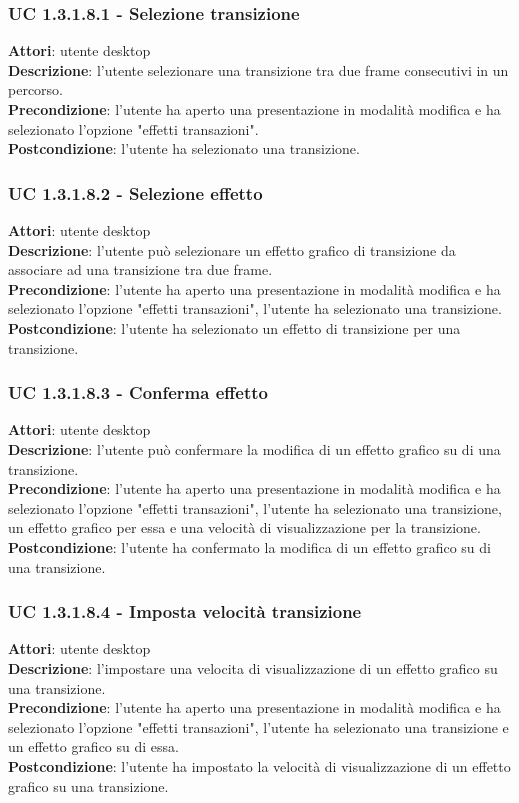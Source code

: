 \subsubsection{UC 1.3.1.8.1 - Selezione transizione}{
	\label{uc1.3.1..8.1}
	\textbf{Attori}: utente desktop \\
	\textbf{Descrizione}: l'utente selezionare una transizione tra due frame consecutivi in un percorso. \\
	\textbf{Precondizione}: l'utente ha aperto una presentazione in modalità modifica e ha selezionato l'opzione "effetti transazioni".	\\
	\textbf{Postcondizione}: l'utente ha selezionato una transizione.	
}
\subsubsection{UC 1.3.1.8.2 - Selezione effetto}{
	\label{uc1.3.1.8.2}
	\textbf{Attori}: utente desktop \\
	\textbf{Descrizione}: l'utente può selezionare un effetto grafico di transizione da associare ad una transizione tra due frame. \\
	\textbf{Precondizione}: l'utente ha aperto una presentazione in modalità modifica e ha selezionato l'opzione "effetti transazioni", l'utente ha selezionato una transizione.	\\
	\textbf{Postcondizione}: l'utente ha selezionato un effetto di transizione per una transizione.	
}
\subsubsection{UC 1.3.1.8.3 - Conferma effetto}{
	\label{uc1.3.1.8.3}
	\textbf{Attori}: utente desktop \\
	\textbf{Descrizione}: l'utente può confermare la modifica di un effetto grafico su di una transizione. \\
	\textbf{Precondizione}: l'utente ha aperto una presentazione in modalità modifica e ha selezionato l'opzione "effetti transazioni", l'utente ha selezionato una transizione, un effetto grafico per essa e una velocità di visualizzazione per la transizione.	\\
	\textbf{Postcondizione}: l'utente ha confermato la modifica di un effetto grafico su di una transizione.
}
\subsubsection{UC 1.3.1.8.4 - Imposta velocità transizione}{
	\label{uc1.3.1..8.4}
	\textbf{Attori}: utente desktop \\
	\textbf{Descrizione}: l'impostare una velocita di visualizzazione di un effetto grafico su una transizione. \\
	\textbf{Precondizione}: l'utente ha aperto una presentazione in modalità modifica e ha selezionato l'opzione "effetti transazioni", l'utente ha selezionato una transizione e un effetto grafico su di essa.	\\
	\textbf{Postcondizione}: l'utente ha impostato la velocità di visualizzazione di un effetto grafico su una transizione.
}
